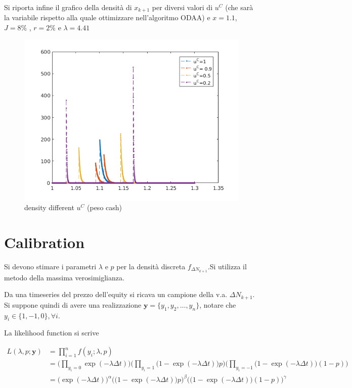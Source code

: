 \documentclass[12pt]{article}
\theoremstyle{break}
\begin{document}
Si riporta infine il grafico della densità di $x_{k+1}$ per diversi valori di $u^C$ (che sarà la variabile rispetto alla quale ottimizzare nell'algoritmo ODAA) e $x = 1.1$, $J = 8\%$ , $r = 2\%$ e $\lambda = 4.41$
\begin{figure}[H]
	\caption{density different $u^C$ (peso cash)}
	\centering
	\includegraphics[width=\textwidth]{ptfDensity.png}
\end{figure}

\section{Calibration}
Si devono stimare i parametri $\lambda$ e $p$ per la densità discreta $f_{\Delta N_{k+1}}$.Si utilizza il metodo della massima verosimiglianza.

Da una timeseries del prezzo dell'equity si ricava un campione della v.a. $\Delta N_{k+1}$. Si suppone quindi di avere una realizzazione $\mathbf{y} = \{y_1,y_2,\ldots,y_n\}$, notare che $ y_i \in \{1,-1,0\}, \forall i$. 

La likelihood function si scrive

\begin{equation}
\begin{split}
L(\lambda,p;\mathbf{y}) & = \prod_{i=1}^{n}f(y_i;\lambda,p)\\
& =\Big(\prod_{y_i = 0}\exp(-\lambda\Delta t) \Big)
\Big(\prod_{y_i=1}\big(1-\exp(-\lambda\Delta t) \big)p \Big)
\Big(\prod_{y_i=-1}\big(1-\exp(-\lambda\Delta t)\big)(1-p) \Big)\\
& = \Big(\exp(-\lambda\Delta t) \Big)^\alpha
\Big(\big(1-\exp(-\lambda\Delta t) \big)p \Big)^\beta
\Big(\big(1-\exp(-\lambda\Delta t)\big)(1-p) \Big)^\gamma
\end{split}
\end{equation}
\end{document}
